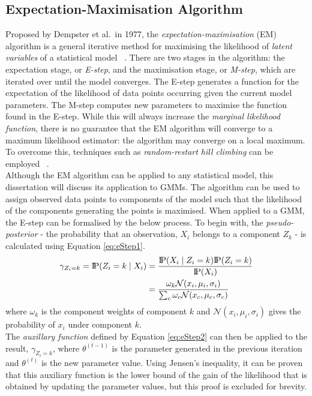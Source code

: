 \subsection{Expectation-Maximisation Algorithm}
\label{sec:EMAlg}
\setlength{\leftskip}{0.5cm}
\indent \indent
Proposed by Dempster et al.\ in 1977, the \textit{expectation-maximisation} (EM) algorithm is a general iterative method for maximising the likelihood of \textit{latent variables} of a statistical model ~\cite{Dempster}. There are two stages in the algorithm: the expectation stage, or \textit{E-step}, and the maximisation stage, or \textit{M-step}, which are iterated over until the model converges. The E-step generates a function for the expectation of the likelihood of data points occurring given the current model parameters. The M-step computes new parameters to maximise the function found in the E-step. While this will always increase the \textit{marginal likelihood function}, there is no guarantee that the EM algorithm will converge to a maximum likelihood estimator: the algorithm may converge on a local maximum. To overcome this, techniques such as \textit{random-restart hill climbing} can be employed ~\cite{HillClimbing}.
\smallskip \\ \indent
Although the EM algorithm can be applied to any statistical model, this dissertation will discuss its application to GMMs. The algorithm can be used to assign observed data points to components of the model such that the likelihood of the components generating the points is maximised. When applied to a GMM, the E-step can be formalised by the below process. To begin with, the \textit{pseudo-posterior} - the probability that an observation, $X_i$ belongs to a component $Z_k$  - is calculated using Equation \ref{eq:eStep1}.
\begin{align}
    \label{eq:eStep1}
    \gamma_{Z_i = k} = \text{I\kern-0.15em P} (Z_i = k \; | \; X_i) &= \frac{\text{I\kern-0.15em P} (X_i \; | \; Z_i = k) \text{I\kern-0.15em P}(Z_i=k)}{\text{I\kern-0.15em P}(X_i)} \\
                     &= \frac{\omega_k \mathcal{N}(x_i, \mu_i, \sigma_i)}{\sum_c \omega_c \mathcal{N} (x_c, \mu_c, \sigma_c)} 
\end{align}
where $\omega_k$ is the component weights of component $k$ and $\mathcal{N}(x_i, \mu_i, \sigma_i)$ gives the probability of $x_i$ under component $k$.
\smallskip \\ \indent
The \textit{auxillary function} defined by Equation \ref{eq:eStep2} can then be applied to the result, $\gamma_{Z_i = k}$, where $\theta^{(t-1)}$ is the parameter generated in the previous iteration and $\theta^{(t)}$ is the new parameter value. Using Jensen's inequality, it can be proven that this auxiliary function is the lower bound of the gain of the likelihood that is obtained by updating the parameter values, but this proof is excluded for brevity.
